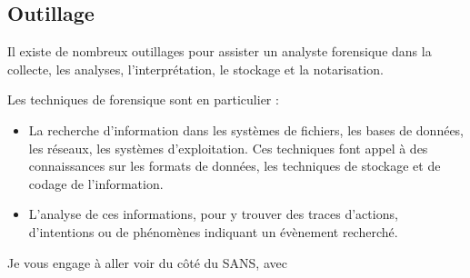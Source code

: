 \subsection{Outillage}

Il existe de nombreux outillages pour assister un analyste forensique dans la collecte, les analyses, l'interprétation, le stockage et la notarisation.

Les techniques de forensique sont en particulier  :

\begin{itemize}
  \item La recherche d'information dans les systèmes de fichiers, les bases de données, les réseaux, les systèmes d'exploitation. Ces techniques font appel à des connaissances sur les formats de données, les techniques de stockage et de codage de l'information. 
  \item L'analyse de ces informations, pour y trouver des traces d'actions, d'intentions ou de phénomènes indiquant un évènement recherché. 
\end{itemize}

Je  vous engage à aller voir du côté du SANS, avec 




